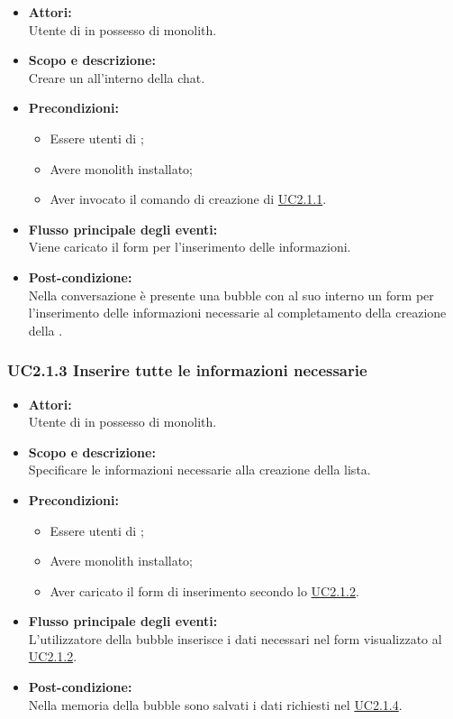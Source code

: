 \begin{itemize}
	\item \textbf{Attori:}
	\\Utente di  in possesso di monolith.
	\item \textbf{Scopo e descrizione:} 
	\\Creare un  all'interno della chat.
	\item \textbf{Precondizioni:}
	\begin{itemize}
		\item Essere utenti di ;
		\item Avere monolith installato;
		\item Aver invocato il comando di creazione di  \hyperref[UC2.1.1]{UC2.1.1}.
	\end{itemize}
	\item \textbf{Flusso principale degli eventi:}
	\\Viene caricato il form per l’inserimento delle informazioni.
	\item \textbf{Post-condizione:}
	\\Nella conversazione è presente una bubble  con al suo interno un form per l'inserimento delle informazioni necessarie al completamento della creazione della .
\end{itemize}

\subsubsection{UC2.1.3 Inserire tutte le informazioni necessarie} \label{UC2.1.3}

\begin{itemize}
	\item \textbf{Attori:}
	\\Utente di  in possesso di monolith.
	\item \textbf{Scopo e descrizione:} 
	\\Specificare le informazioni necessarie alla creazione della lista.
	\item \textbf{Precondizioni:}
	\begin{itemize}
		\item Essere utenti di ;
		\item Avere monolith installato;
		\item Aver caricato il form di inserimento secondo lo \hyperref[UC2.1.2]{UC2.1.2}.
	\end{itemize}
	\item \textbf{Flusso principale degli eventi:}
	\\L'utilizzatore della bubble inserisce i dati necessari nel form visualizzato al  \hyperref[UC2.1.2]{UC2.1.2}.
	\item \textbf{Post-condizione:}
	\\Nella memoria della bubble sono salvati i dati richiesti nel  \hyperref[UC2.1.4]{UC2.1.4}. 
\end{itemize}


